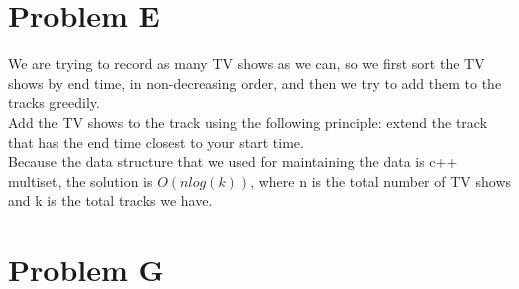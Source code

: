 \documentclass[10pt]{article}
\begin{document}


\section*{Problem E}

We are trying to record as many TV shows as we can, so we first sort the TV shows by end time, in non-decreasing order, and then we try to add them to the tracks greedily.\\

Add the TV shows to the track using the following principle: extend the track that has the end time closest to your start time. \\

Because the data structure that we used for maintaining the data is c++ multiset, the solution is $O(nlog(k))$, where n is the total number of TV shows and k is the total tracks we have. 



\newpage



\section*{Problem G}



\newpage
\end{document}

